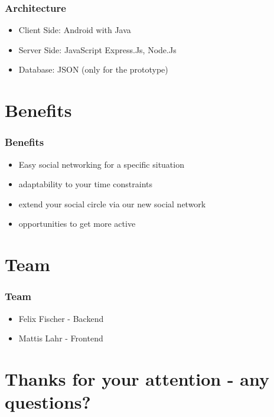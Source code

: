 \documentclass[aspectratio=169]{beamer}
\begin{document}
	 \begin{frame}
		\frametitle{Architecture}
		\begin{itemize}
			\item Client Side: Android with Java
			\item Server Side: JavaScript Express.Js, Node.Js
			\item Database: JSON (only for the prototype)
		\end{itemize}
	\end{frame}


\section{Benefits}

	\begin{frame}
		\frametitle{Benefits}
		\begin{itemize}
			\item Easy social networking for a specific situation
			\item adaptability to your time constraints
			\item extend your social circle via our new social network
			\item opportunities to get more active
		\end{itemize}
	\end{frame}

\section{Team}

	\begin{frame}
		\frametitle{Team}
		\begin{itemize}
			\item Felix Fischer - Backend 
			\item Mattis Lahr - Frontend
		\end{itemize}
	\end{frame}

\section{Thanks for your attention - any questions?}
\end{document}
